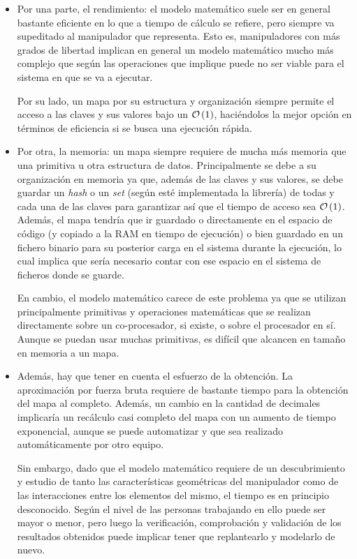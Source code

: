 \begin{itemize}
    \item Por una parte, el rendimiento: el modelo matemático suele ser en general
          bastante eficiente en lo que a tiempo de cálculo se refiere, pero siempre va
          supeditado al manipulador que representa. Esto es, manipuladores con más
          grados de libertad implican en general un modelo matemático mucho más complejo que según
          las operaciones que implique puede no ser viable para el sistema en que se va a ejecutar.

          Por su lado, un mapa por su estructura y organización siempre permite el acceso a las
          claves y sus valores bajo un $\bigO{1}$, haciéndolos la mejor opción en términos
          de eficiencia si se busca una ejecución rápida.

    \item Por otra, la memoria: un mapa siempre requiere de mucha más memoria que
          una primitiva u otra estructura de datos. Principalmente se debe a su organización
          en memoria ya que, además de las claves y sus valores, se debe guardar un \textit{hash}
          o un \textit{set} (según esté implementada la librería) de todas y cada una de las
          claves para garantizar así que el tiempo de acceso sea $\bigO{1}$.
          Además, el mapa tendría que ir guardado o directamente en el espacio de código
          (y copiado a la \ac{RAM} en tiempo de ejecución) o bien guardado en un fichero
          binario para su posterior carga en el sistema durante la ejecución, lo cual implica
          que sería necesario contar con ese espacio en el sistema de ficheros donde se guarde.

          En cambio, el modelo matemático carece de este problema ya que se utilizan
          principalmente primitivas y operaciones matemáticas que se realizan directamente
          sobre un co-procesador, si existe, o sobre el procesador en sí. Aunque se puedan
          usar muchas primitivas, es difícil que alcancen en tamaño en memoria a un mapa.

    \item Además, hay que tener en cuenta el esfuerzo de la obtención. La aproximación
          por fuerza bruta requiere de bastante tiempo para la obtención del mapa al completo.
          Además, un cambio en la cantidad de decimales implicaría un recálculo casi completo del mapa
          con un aumento de tiempo exponencial, aunque se puede automatizar y que sea realizado
          automáticamente por otro equipo.

          Sin embargo, dado que el modelo matemático requiere de un descubrimiento y estudio
          de tanto las características geométricas del manipulador como de las interacciones
          entre los elementos del mismo, el tiempo es en principio desconocido. Según el nivel
          de las personas trabajando en ello puede ser mayor o menor, pero luego la verificación,
          comprobación y validación de los resultados obtenidos puede implicar tener que 
          replantearlo y modelarlo de nuevo.
\end{itemize}

